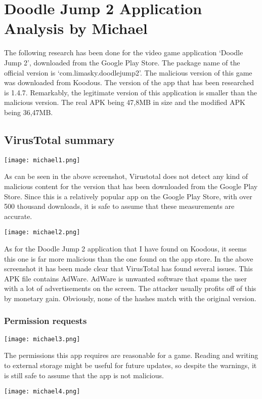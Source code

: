\section{Doodle Jump 2 Application Analysis by Michael}

The following research has been done for the video game application ‘Doodle Jump 2’, downloaded from the Google Play Store. The package name of the official version is ‘com.limasky.doodlejump2’. The malicious version of this game was downloaded from Koodous. The version of the app that has been researched is 1.4.7. Remarkably, the legitimate version of this application is smaller than the malicious version. The real APK being 47,8MB in size and the modified APK being 36,47MB.
\subsection{VirusTotal summary}


\texttt{[image: michael1.png]}

As can be seen in the above screenshot, Virustotal does not detect any kind of malicious content for the version that has been downloaded from the Google Play Store. Since this is a relatively popular app on the Google Play Store, with over 500 thousand downloads, it is safe to assume that these measurements are accurate.


\texttt{[image: michael2.png]}

As for the Doodle Jump 2 application that I have found on Koodous, it seems this one is far more malicious than the one found on the app store. In the above screenshot it has been made clear that VirusTotal has found several issues. This APK file contains AdWare. AdWare is unwanted software that spams the user with a lot of advertisements on the screen. The attacker usually profits off of this by monetary gain. Obviously, none of the hashes match with the original version.
\subsubsection{Permission requests}

\texttt{[image: michael3.png]}

The permissions this app requires are reasonable for a game. Reading and writing to external storage might be useful for future updates, so despite the warnings, it is still safe to assume that the app is not malicious.

\texttt{[image: michael4.png]}


